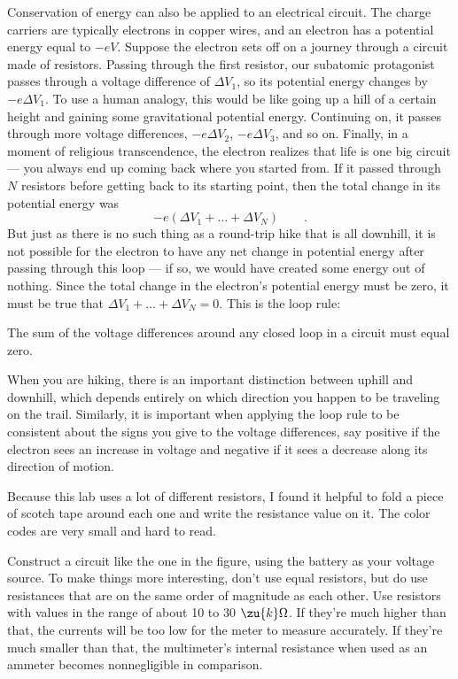 Conservation of energy can also be applied to an electrical
circuit. The charge carriers are typically electrons in
copper wires, and an electron has a potential energy equal
to $-eV$. Suppose the electron sets off on a journey through a
circuit made of resistors. Passing through the first
resistor, our subatomic protagonist passes through a voltage
difference of $\Delta V_1$, so its potential 
energy changes by $-e\Delta V_1$. To use
a human analogy, this would be like going up a hill of a
certain height and gaining some gravitational potential
energy. Continuing on, it passes through more voltage
differences, $-e\Delta V_2$, $-e\Delta V_3$, and so on. Finally, in a moment of
religious transcendence, the electron realizes that life is
one big circuit --- you always end up coming back where you
started from. If it passed through $N$ resistors before
getting back to its starting point, then the total change in
its potential energy was 
\begin{equation*}
	-e\left(\Delta V_1+\ldots+\Delta V_N\right) \qquad .
\end{equation*}
But just as there is no such
thing as a round-trip hike that is all downhill, it is not
possible for the electron to have any net change in
potential energy after passing through this loop --- if so,
we would have created some energy out of nothing. Since the
total change in the electron's potential energy must be
zero, it must be true that $\Delta V_1+\ldots+\Delta V_N=0$.
This is the loop rule:

The sum of the voltage differences around any closed loop
in a circuit must equal zero.

When you are hiking, there is an important distinction
between uphill and downhill, which depends entirely on which
direction you happen to be traveling on the trail.
Similarly, it is important when applying the loop rule to be
consistent about the signs you give to the voltage
differences, say positive if the electron sees an increase
in voltage and negative if it sees a decrease along its
direction of motion.

\observations

Because this lab uses a lot of different resistors, I found it helpful to
fold a piece of scotch tape around each one and write the resistance
value on it. The color codes are very small and hard to read.


Construct a circuit like the one in the figure, using the battery
as your voltage source. To make things more
interesting, don't use equal resistors, but do use resistances that
are on the same order of magnitude as each other. Use 
resistors with values in the range of about 10 to 30 $\zu{k}\Omega$.
If they're much higher than that, the currents will be too low for the 
meter to measure accurately.
If they're much smaller than that, the
multimeter's internal resistance when used as an
ammeter becomes nonnegligible in comparison.

